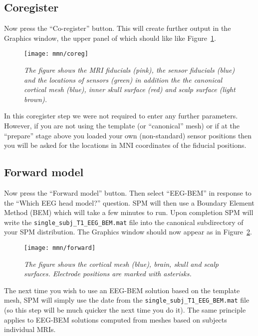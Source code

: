 \subsection{Coregister}

Now press the ``Co-register'' button. This will create further output in the Graphics window, the upper panel of which should like like Figure~\ref{coreg}.
\begin{figure}
\begin{center}
\texttt{[image: mmn/coreg]}
\caption{\em
The figure shows the MRI fiducials (pink), the sensor fiducials (blue) and the locations of sensors (green) in addition the the canonical cortical mesh (blue), inner skull surface (red) and scalp surface (light brown).
\label{coreg}}
\end{center}
\end{figure}

In this coregister step we were not required to enter any further parameters. However, if you are not using the template (or ``canonical'' mesh) or if at the ``prepare'' stage above you loaded your own (non-standard) sensor positions then you will be asked for the locations in MNI coordinates of the fiducial positions.

\subsection{Forward model}

Now press the ``Forward model'' button. Then select ``EEG-BEM'' in response to the ``Which EEG head model?'' question. SPM will then use a Boundary Element Method (BEM) which will take a few minutes to run. Upon completion SPM will write the \texttt{single\_subj\_T1\_EEG\_BEM.mat} file into the canonical subdirectory of your SPM distribution. The Graphics window should now appear as in Figure~\ref{forward}.
\begin{figure}
\begin{center}
\texttt{[image: mmn/forward]}
\caption{\em
The figure shows the cortical mesh (blue), brain, skull and scalp surfaces. Electrode positions are marked with asterisks.
\label{forward}}
\end{center}
\end{figure}
The next time you wish to use an EEG-BEM solution based on the template mesh, SPM will simply use the date from the \texttt{single\_subj\_T1\_EEG\_BEM.mat} file (so this step will be much quicker the next time you do it). The same principle applies to EEG-BEM solutions computed from meshes based on subjects individual MRIs.

